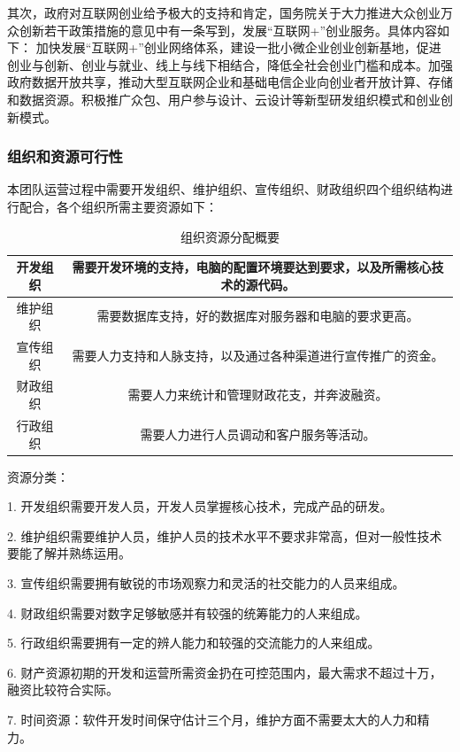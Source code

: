 \documentclass[10pt,letterpaper]{article}
\begin{document}
其次，政府对互联网创业给予极大的支持和肯定，国务院关于大力推进大众创业万众创新若干政策措施的意见中有一条写到，发展“互联网+”创业服务。具体内容如下：
加快发展“互联网+”创业网络体系，建设一批小微企业创业创新基地，促进创业与创新、创业与就业、线上与线下相结合，降低全社会创业门槛和成本。加强政府数据开放共享，推动大型互联网企业和基础电信企业向创业者开放计算、存储和数据资源。积极推广众包、用户参与设计、云设计等新型研发组织模式和创业创新模式。

\subsubsection{组织和资源可行性}

本团队运营过程中需要开发组织、维护组织、宣传组织、财政组织四个组织结构进行配合，各个组织所需主要资源如下：

\begin{table}[!htbp]
\centering
\begin{tabular}{|c|c|}
\hline
开发组织 & 需要开发环境的支持，电脑的配置环境要达到要求，以及所需核心技术的源代码。 \\
\hline
维护组织 & 需要数据库支持，好的数据库对服务器和电脑的要求更高。 \\
\hline
宣传组织 & 需要人力支持和人脉支持，以及通过各种渠道进行宣传推广的资金。 \\
\hline
财政组织 & 需要人力来统计和管理财政花支，并奔波融资。 \\
\hline
行政组织 & 需要人力进行人员调动和客户服务等活动。 \\
\hline
\end{tabular}
\caption{组织资源分配概要}\label{tab:aStrangeTable}
\end{table}

资源分类：

1.	开发组织需要开发人员，开发人员掌握核心技术，完成产品的研发。

2.	维护组织需要维护人员，维护人员的技术水平不要求非常高，但对一般性技术要能了解并熟练运用。

3.	宣传组织需要拥有敏锐的市场观察力和灵活的社交能力的人员来组成。

4.	财政组织需要对数字足够敏感并有较强的统筹能力的人来组成。

5.	行政组织需要拥有一定的辨人能力和较强的交流能力的人来组成。

6.	财产资源初期的开发和运营所需资金扔在可控范围内，最大需求不超过十万，融资比较符合实际。

7.	时间资源：软件开发时间保守估计三个月，维护方面不需要太大的人力和精力。
\end{document}
